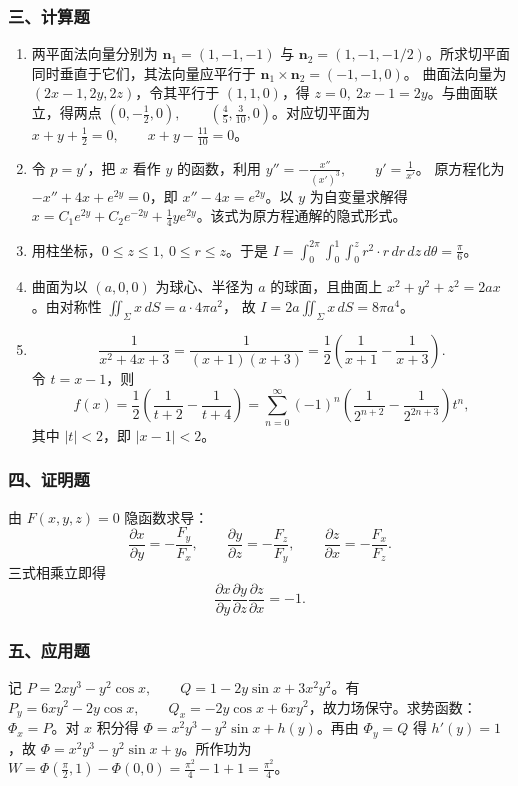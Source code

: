\subsubsection*{三、计算题}
\begin{enumerate}
  \item 两平面法向量分别为 $\mathbf n_1=(1,-1,-1)$ 与 $\mathbf n_2=(1,-1,-1/2)$。所求切平面同时垂直于它们，其法向量应平行于
  \(\displaystyle \mathbf n_1\times\mathbf n_2=(-1,-1,0)\)。
  曲面法向量为 $(2x-1,2y,2z)$，令其平行于 $(1,1,0)$，得 $z=0,\ 2x-1=2y$。与曲面联立，得两点
  \(\displaystyle \left(0,-\frac12,0\right),\qquad \left(\frac45,\frac3{10},0\right)\)。对应切平面为
  \(\displaystyle x+y+\frac12=0,\qquad x+y-\frac{11}{10}=0\)。
  \item 令 $p=y'$，把 $x$ 看作 $y$ 的函数，利用
  \(\displaystyle y''=-\frac{x''}{(x')^3},\qquad y'=\frac1{x'}\)。
  原方程化为 \(\displaystyle -x''+4x+e^{2y}=0\)，即
  \(\displaystyle x''-4x=e^{2y}\)。以 $y$ 为自变量求解得
  \(\displaystyle x=C_1e^{2y}+C_2e^{-2y}+\frac14 y e^{2y}\)。该式为原方程通解的隐式形式。
  \item 用柱坐标，$0\le z\le1,\ 0\le r\le z$。于是
  \(\displaystyle I=\int_0^{2\pi}\int_0^1\int_0^z r^2\cdot r\,dr\,dz\,d\theta
  =\frac{\pi}{6}\)。
  \item 曲面为以 $(a,0,0)$ 为球心、半径为 $a$ 的球面，且曲面上 $x^2+y^2+z^2=2ax$。由对称性
  \(\displaystyle \iint_\Sigma x\,dS=a\cdot4\pi a^2\)，
  故
  \(\displaystyle I=2a\iint_\Sigma x\,dS=8\pi a^4\)。
  \item
  \[
  \frac1{x^2+4x+3}=\frac1{(x+1)(x+3)}
  =\frac12\left(\frac1{x+1}-\frac1{x+3}\right).
  \]
  令 $t=x-1$，则
  \[
  f(x)=\frac12\left(\frac1{t+2}-\frac1{t+4}\right)
  =\sum_{n=0}^{\infty}(-1)^n\left(\frac1{2^{n+2}}-\frac1{2^{2n+3}}\right)t^n,
  \]
  其中 $|t|<2$，即 $|x-1|<2$。
\end{enumerate}

\subsubsection*{四、证明题}
由 $F(x,y,z)=0$ 隐函数求导：
\[
\frac{\partial x}{\partial y}=-\frac{F_y}{F_x},\qquad
\frac{\partial y}{\partial z}=-\frac{F_z}{F_y},\qquad
\frac{\partial z}{\partial x}=-\frac{F_x}{F_z}.
\]
三式相乘立即得
\[
\frac{\partial x}{\partial y}\frac{\partial y}{\partial z}\frac{\partial z}{\partial x}=-1.
\]

\subsubsection*{五、应用题}
记 \(\displaystyle P=2xy^3-y^2\cos x,\qquad Q=1-2y\sin x+3x^2y^2\)。有
\(\displaystyle P_y=6xy^2-2y\cos x,\qquad Q_x=-2y\cos x+6xy^2\)，故力场保守。求势函数：\(\displaystyle \Phi_x=P\)。对 $x$ 积分得
\(\displaystyle \Phi=x^2y^3-y^2\sin x+h(y)\)。再由 $\Phi_y=Q$ 得 $h'(y)=1$，故
\(\displaystyle \Phi=x^2y^3-y^2\sin x+y\)。所作功为
\(\displaystyle W=\Phi\!\left(\frac\pi2,1\right)-\Phi(0,0)
=\frac{\pi^2}{4}-1+1=\frac{\pi^2}{4}\)。

